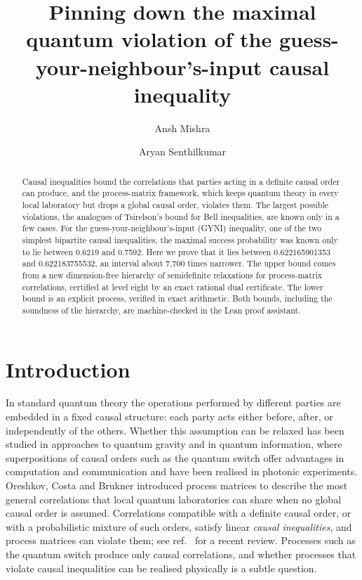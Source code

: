 \documentclass[11pt]{article}
\title{Pinning down the maximal quantum violation of the guess-your-neighbour's-input causal inequality}
\author[1]{Ansh Mishra}
\author[2]{Aryan Senthilkumar}
\affil[1]{Independent researcher, Cumming, GA, USA}
\affil[2]{Independent researcher, Johns Creek, GA, USA}
\date{}
\begin{document}
\maketitle

\begin{abstract}
\noindent
Causal inequalities bound the correlations that parties acting in a definite causal order can produce, and the process-matrix framework, which keeps quantum theory in every local laboratory but drops a global causal order, violates them. The largest possible violations, the analogues of Tsirelson's bound for Bell inequalities, are known only in a few cases. For the guess-your-neighbour's-input (GYNI) inequality, one of the two simplest bipartite causal inequalities, the maximal success probability was known only to lie between 0.6219 and 0.7592. Here we prove that it lies between 0.622165901353 and 0.622183755532, an interval about 7,700 times narrower. The upper bound comes from a new dimension-free hierarchy of semidefinite relaxations for process-matrix correlations, certified at level eight by an exact rational dual certificate. The lower bound is an explicit process, verified in exact arithmetic. Both bounds, including the soundness of the hierarchy, are machine-checked in the Lean proof assistant.
\end{abstract}

\onehalfspacing
\linenumbers

\section*{Introduction}

In standard quantum theory the operations performed by different parties are embedded in a fixed causal structure: each party acts either before, after, or independently of the others. Whether this assumption can be relaxed has been studied in approaches to quantum gravity\cite{Hardy2007} and in quantum information, where superpositions of causal orders such as the quantum switch\cite{Chiribella2013} offer advantages in computation and communication\cite{Araujo2014,Guerin2016,Ebler2018} and have been realised in photonic experiments\cite{Procopio2015,Rubino2017}. Oreshkov, Costa and Brukner introduced process matrices to describe the most general correlations that local quantum laboratories can share when no global causal order is assumed\cite{Oreshkov2012}. Correlations compatible with a definite causal order, or with a probabilistic mixture of such orders, satisfy linear \emph{causal inequalities}\cite{Oreshkov2012,Branciard2016,OreshkovGiarmatzi2016,Abbott2016}, and process matrices can violate them\cite{Oreshkov2012}; see ref.~ for a recent review. Processes such as the quantum switch produce only causal correlations, and whether processes that violate causal inequalities can be realised physically is a subtle question\cite{PurvesShort2021,Wechs2023}.
\end{document}
